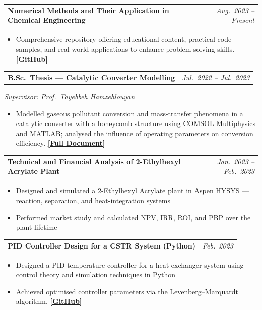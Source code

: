\documentclass[10pt, a4paper]{article}
\makeatletter
\newcommand{\entrysep}{\vspace{3pt}}
\newcommand{\entryheader}[2]{%
  \noindent
  \begin{tabularx}{\linewidth}{@{}X r@{}}
    \textbf{\color{NavyPrimary}#1} & \textit{\small\color{NavyMid}#2}
  \end{tabularx}%
  \par\vspace{1pt}%
}
\newcommand{\entrysub}[1]{%
  {\small\itshape #1}\par\vspace{1pt}%
}
\makeatother
\begin{document}
\entrysep

\entryheader{Numerical Methods and Their Application in Chemical Engineering}%
            {Aug.\ 2023 -- Present}
\begin{itemize}
  \item Comprehensive repository offering educational content, practical code
        samples, and real-world applications to enhance problem-solving skills.
        \href{https://github.com/SinaGhanbarii/Numerical-Methods-and-Their-Application-in-Chemical-Engineering}%
             {\textbf{[GitHub]}}
\end{itemize}

\entrysep

\entryheader{B.Sc.\ Thesis — Catalytic Converter Modelling}%
            {Jul.\ 2022 -- Jul.\ 2023}
\entrysub{Supervisor: Prof.\ Tayebbeh Hamzehlouyan}
\begin{itemize}
  \item Modelled gaseous pollutant conversion and mass-transfer phenomena in a
        catalytic converter with a honeycomb structure using COMSOL Multiphysics
        and MATLAB; analysed the influence of operating parameters on conversion
        efficiency.
        \href{https://drive.google.com/file/d/1XvlRVqSWWViUHNb8WccJ51BwvILRJ_UE/view?usp=sharing}%
             {\textbf{[Full Document]}}
\end{itemize}

\entrysep

\entryheader{Technical and Financial Analysis of 2-Ethylhexyl Acrylate Plant}%
            {Jan.\ 2023 -- Feb.\ 2023}
\begin{itemize}
  \item Designed and simulated a 2-Ethylhexyl Acrylate plant in Aspen HYSYS —
        reaction, separation, and heat-integration systems
  \item Performed market study and calculated NPV, IRR, ROI, and PBP over the
        plant lifetime
\end{itemize}

\entrysep

\entryheader{PID Controller Design for a CSTR System (Python)}{Feb.\ 2023}
\begin{itemize}
  \item Designed a PID temperature controller for a heat-exchanger system using
        control theory and simulation techniques in Python
  \item Achieved optimised controller parameters via the Levenberg--Marquardt
        algorithm.
        \href{https://github.com/SinaGhanbarii/Design-a-PID-Controller-to-Maintain-the-Parameters-of-a-System-of-CSTR-Reactors}%
             {\textbf{[GitHub]}}
\end{itemize}
\end{document}
